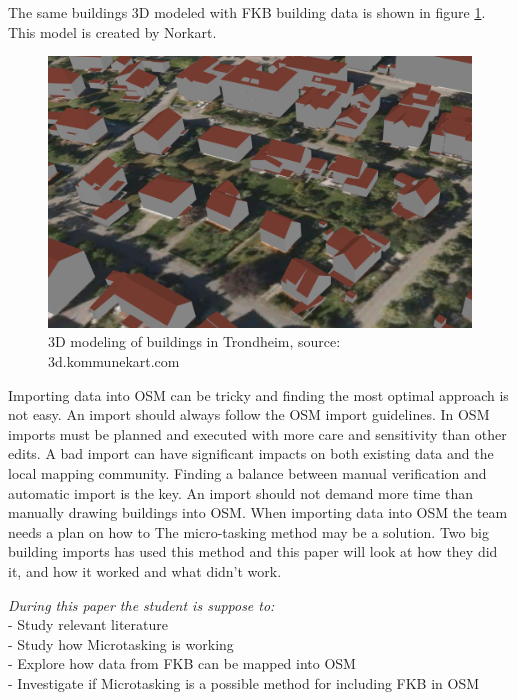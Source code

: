 \documentclass[12pt, a4paper]{report}   	%
\begin{document}
The same buildings 3D modeled with FKB building data is shown in figure \ref{fig:3DekstrdFKB}. This model is created by Norkart. 

\begin{figure}[H]
    \centering
    \includegraphics[scale=0.3]{figures/FixedByMe/3DmodelTRD-FKB.png}
    \caption{3D modeling of buildings in Trondheim, source: 3d.kommunekart.com}
    \label{fig:3DekstrdFKB}
\end{figure}  

Importing data into OSM can be tricky and finding the most optimal approach is not easy. An import should always follow the OSM import guidelines. In OSM imports must be planned and executed with more care and sensitivity than other edits. A bad import can have significant impacts on both existing data and the local mapping community. Finding a balance between manual verification and automatic import is the key. An import should not demand more time than manually drawing buildings into OSM. %
When importing data into OSM the team needs a plan on how to The micro-tasking method may be a solution. Two big building imports has used this method and this paper will look at how they did it, and how it worked and what didn't work. 

\textit{During this paper the student is suppose to:} \\
- Study relevant literature \\
- Study how Microtasking is working \\
- Explore how data from FKB can be mapped into OSM \\
- Investigate if Microtasking is a possible method for including FKB in OSM \\
\end{document}
